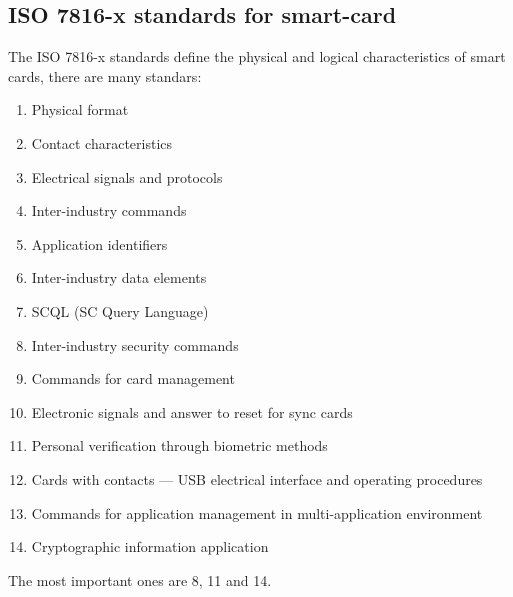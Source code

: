 \subsection{ISO 7816-x standards for smart-card}
The ISO 7816-x standards define the physical and logical
characteristics of smart cards, there are many standars:
\begin{enumerate}
  \item Physical format
  \item Contact characteristics
  \item Electrical signals and protocols
  \item Inter-industry commands
  \item Application identifiers
  \item Inter-industry data elements
  \item SCQL (SC Query Language)
  \item Inter-industry security commands
  \item Commands for card management
  \item Electronic signals and answer to reset for sync cards
  \item Personal verification through biometric methods
  \item Cards with contacts — USB electrical interface and operating procedures
  \item Commands for application management in multi-application environment
  \item Cryptographic information application
\end{enumerate}
The most important ones are 8, 11 and 14.

